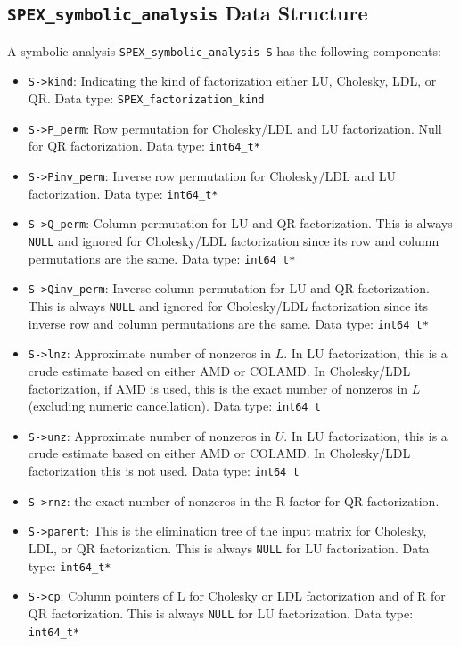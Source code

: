 \documentclass[12pt,oneside]{book}
\theoremstyle{definition}
\begin{document}
\subsection{\texttt{SPEX\_symbolic\_analysis} Data Structure} \label{ss:SPEX_symbolic_struct}
A symbolic analysis \verb|SPEX_symbolic_analysis S| has the following components:

\begin{itemize}
\item \verb|S->kind|: Indicating the kind of factorization either LU, Cholesky, LDL, or QR. Data type: \verb|SPEX_factorization_kind|

\item \verb|S->P_perm|: Row permutation for Cholesky/LDL and LU factorization. Null for QR factorization. Data type: \verb|int64_t*|

\item \verb|S->Pinv_perm|: Inverse row permutation for Cholesky/LDL and LU factorization. Data type: \verb|int64_t*|

\item \verb|S->Q_perm|: Column permutation for LU and QR factorization. This is always \verb|NULL| and ignored for Cholesky/LDL factorization since its row and column permutations are the same. Data type: \verb|int64_t*|

\item \verb|S->Qinv_perm|: Inverse column permutation for LU and QR factorization. This is always \verb|NULL| and ignored for Cholesky/LDL factorization since its inverse row and column permutations are the same. Data type: \verb|int64_t*|

\item \verb|S->lnz|: Approximate number of nonzeros in $L$. In LU factorization, this is a crude estimate based on either AMD or COLAMD. In Cholesky/LDL factorization, if AMD is used, this is the exact number of nonzeros in $L$ (excluding numeric cancellation). Data type: \verb|int64_t|

\item \verb|S->unz|: Approximate number of nonzeros in $U$. In LU factorization, this is a crude estimate based on either AMD or COLAMD. In Cholesky/LDL factorization this is not used. Data type: \verb|int64_t|

\item \verb|S->rnz|: the exact number of nonzeros in the R factor for QR factorization.

\item \verb|S->parent|: This is the elimination tree of the input matrix for Cholesky, LDL, or QR factorization. This is always \verb|NULL| for LU factorization. Data type: \verb|int64_t*|

\item \verb|S->cp|: Column pointers of L for Cholesky or LDL factorization and of R for QR factorization. This is always \verb|NULL| for LU factorization. Data type: \verb|int64_t*|

\end{itemize}
\end{document}
